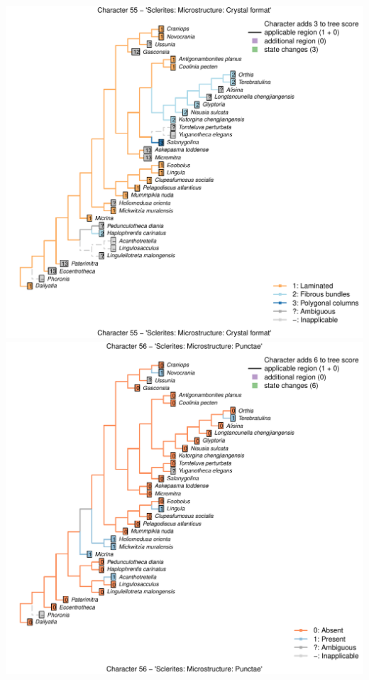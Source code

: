 \documentclass[]{book}
\theoremstyle{definition}
\theoremstyle{definition}
\theoremstyle{definition}
\theoremstyle{remark}
\begin{document}
\includegraphics{Brachiopod_phylogeny_files/figure-latex/unnamed-chunk-4-55.pdf}
\includegraphics{Brachiopod_phylogeny_files/figure-latex/unnamed-chunk-4-56.pdf}
\end{document}
